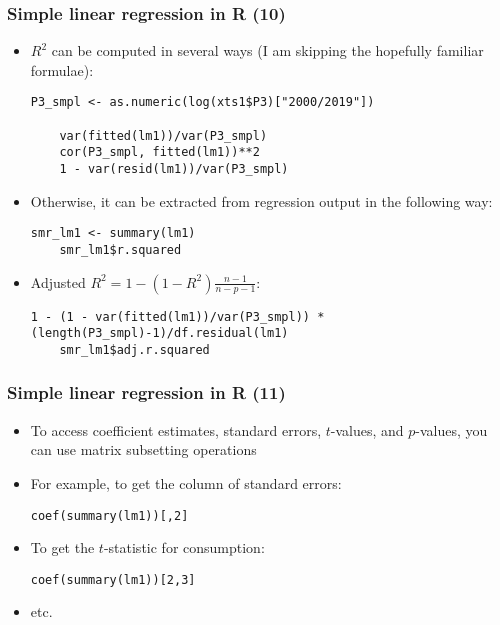 \documentclass[10pt]{beamer}
\theoremstyle{definition}
\begin{document}
\begin{frame}[fragile]
\frametitle{Simple linear regression in R (10)}
\begin{itemize}
	\item $R^{2}$ can be computed in several ways (I am skipping the hopefully familiar formulae):
	\begin{lstlisting}[style = rstyle, breaklines]
	P3_smpl <- as.numeric(log(xts1$P3)["2000/2019"])

	var(fitted(lm1))/var(P3_smpl)
	cor(P3_smpl, fitted(lm1))**2
	1 - var(resid(lm1))/var(P3_smpl)
	\end{lstlisting}
	\item Otherwise, it can be extracted from regression output in the following way:
	\begin{lstlisting}[style = rstyle, breaklines]
	smr_lm1 <- summary(lm1)
	smr_lm1$r.squared
	\end{lstlisting}
	\item Adjusted $R^{2} = \displaystyle 1 - (1-R^{2})\frac{n-1}{n-p-1}$:
	\begin{lstlisting}[style = rstyle, breaklines]
	1 - (1 - var(fitted(lm1))/var(P3_smpl)) * (length(P3_smpl)-1)/df.residual(lm1)
	smr_lm1$adj.r.squared
	\end{lstlisting}
\end{itemize}
\end{frame}

\begin{frame}[fragile]
\frametitle{Simple linear regression in R (11)}
\begin{itemize}
	\item To access coefficient estimates, standard errors, $t$-values, and $p$-values, you can use matrix subsetting operations
	\item For example, to get the column of standard errors:
	\begin{lstlisting}[style = rstyle, breaklines]
	coef(summary(lm1))[,2]
	\end{lstlisting}
	\item To get the $t$-statistic for consumption:
	\begin{lstlisting}[style = rstyle, breaklines]
	coef(summary(lm1))[2,3]
	\end{lstlisting}
	\item etc.
\end{itemize}
\end{frame}
\end{document}
